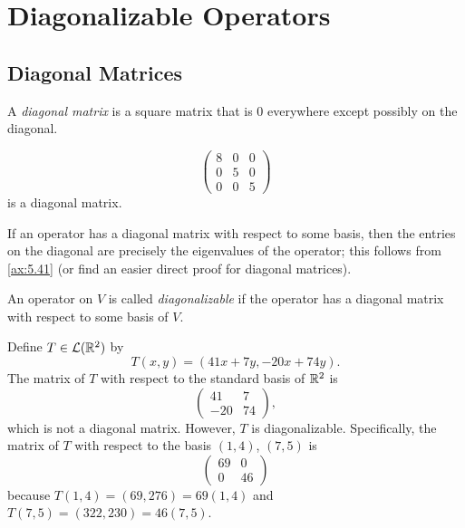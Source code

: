 \DeclareRobustCommand\axtag[1]{\refstepcounter{theorem}\tag{\thetheorem}\label{#1}}
\section{Diagonalizable Operators}

\subsection{Diagonal Matrices}

\begin{definition}\label{ax:5.48}
A \emph{diagonal matrix} is a square matrix that is $0$ everywhere except
possibly on the diagonal.
\end{definition}

\begin{example}\label{ax:5.49}\leavevmode
\[ \begin{pmatrix} 8&0&0\\ 0&5&0\\ 0&0&5 \end{pmatrix} \]
is a diagonal matrix.
\end{example}

%
If an operator has a diagonal matrix with respect to some basis, then the entries
on the diagonal are precisely the eigenvalues of the operator; this follows from
\ref{ax:5.41} (or find an easier direct proof for diagonal matrices).

\begin{definition}[Diagonalizable]\label{ax:5.50}
An operator on $V$ is called \emph{diagonalizable} if the operator has a diagonal
matrix with respect to some basis of $V$.
\end{definition}

\begin{example}\label{ax:5.51}
Define $T\in\mathcal{L}(\mathbb{R}^2)$ by
\[ T(x,y)=(41x+7y,-20x+74y). \]
The matrix of $T$ with respect to the standard basis of $\mathbb{R}^2$ is
\[ \begin{pmatrix} 41&7\\ -20&74 \end{pmatrix}, \]
which is not a diagonal matrix. However, $T$ is diagonalizable. Specifically, the
matrix of $T$ with respect to the basis $(1,4)$, $(7,5)$ is
\[ \begin{pmatrix} 69&0\\ 0&46 \end{pmatrix} \]
because $T(1,4)=(69,276)=69(1,4)$ and $T(7,5)=(322,230)=46(7,5)$.
\end{example}

